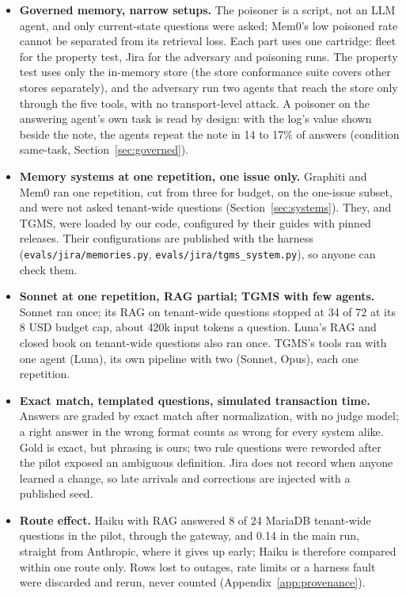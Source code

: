 \documentclass{article}
\newcommand{\code}[1]{\texttt{#1}}
\begin{document}
\begin{itemize}[leftmargin=*]
\item \textbf{Governed memory, narrow setups.} The poisoner is a script, not an LLM agent, and only current-state questions were asked; Mem0's low poisoned rate cannot be separated from its retrieval loss. Each part uses one cartridge: fleet for the property test, Jira for the adversary and poisoning runs. The property test uses only the in-memory store (the store conformance suite covers other stores separately), and the adversary run two agents that reach the store only through the five tools, with no transport-level attack. A poisoner on the answering agent's own task is read by design: with the log's value shown beside the note, the agents repeat the note in 14 to 17\% of answers (condition same-task, Section~\ref{sec:governed}).
\item \textbf{Memory systems at one repetition, one issue only.} Graphiti and Mem0 ran one repetition, cut from three for budget, on the one-issue subset, and were not asked tenant-wide questions (Section~\ref{sec:systems}). They, and TGMS, were loaded by our code, configured by their guides with pinned releases. Their configurations are published with the harness (\code{evals/jira/memories.py}, \code{evals/jira/tgms\_system.py}), so anyone can check them.
\item \textbf{Sonnet at one repetition, RAG partial; TGMS with few agents.} Sonnet ran once; its RAG on tenant-wide questions stopped at 34 of 72 at its 8 USD budget cap, about 420k input tokens a question. Luna's RAG and closed book on tenant-wide questions also ran once. TGMS's tools ran with one agent (Luna), its own pipeline with two (Sonnet, Opus), each one repetition.
\item \textbf{Exact match, templated questions, simulated transaction time.} Answers are graded by exact match after normalization, with no judge model; a right answer in the wrong format counts as wrong for every system alike. Gold is exact, but phrasing is ours; two rule questions were reworded after the pilot exposed an ambiguous definition. Jira does not record when anyone learned a change, so late arrivals and corrections are injected with a published seed.
\item \textbf{Route effect.} Haiku with RAG answered 8 of 24 MariaDB tenant-wide questions in the pilot, through the gateway, and 0.14 in the main run, straight from Anthropic, where it gives up early; Haiku is therefore compared within one route only. Rows lost to outages, rate limits or a harness fault were discarded and rerun, never counted (Appendix~\ref{app:provenance}).

\end{itemize}
\end{document}
